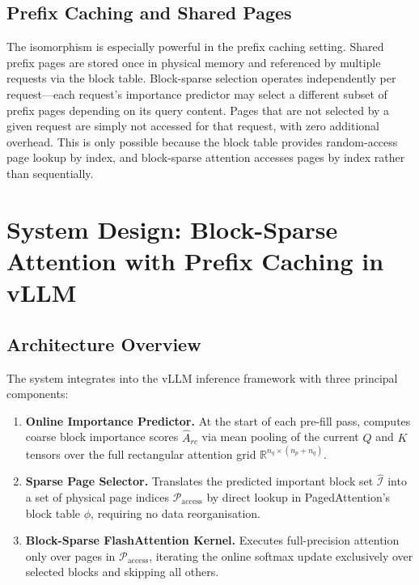 \documentclass{article}
\begin{document}
\subsection{Prefix Caching and Shared Pages}

The isomorphism is especially powerful in the prefix caching setting.
Shared prefix pages are stored once in physical memory and referenced by
multiple requests via the block table. Block-sparse selection operates
independently per request---each request's importance predictor may select
a different subset of prefix pages depending on its query content. Pages
that are not selected by a given request are simply not accessed for that
request, with zero additional overhead. This is only possible because the
block table provides random-access page lookup by index, and block-sparse
attention accesses pages by index rather than sequentially.

\section{System Design: Block-Sparse Attention with Prefix Caching in vLLM}
\label{sec:system}

\subsection{Architecture Overview}

The system integrates into the vLLM inference framework with three
principal components:

\begin{enumerate}
  \item \textbf{Online Importance Predictor.} At the start of each
    pre-fill pass, computes coarse block importance scores $\hat{A}_{rc}$
    via mean pooling of the current $Q$ and $K$ tensors over the full
    rectangular attention grid $\mathbb{R}^{n_q \times (n_p + n_q)}$.
  \item \textbf{Sparse Page Selector.} Translates the predicted important
    block set $\hat{\mathcal{I}}$ into a set of physical page indices
    $\mathcal{P}_{\text{access}}$ by direct lookup in PagedAttention's
    block table $\phi$, requiring no data reorganisation.
  \item \textbf{Block-Sparse FlashAttention Kernel.} Executes
    full-precision attention only over pages in $\mathcal{P}_{\text{access}}$,
    iterating the online softmax update exclusively over selected blocks
    and skipping all others.
\end{enumerate}
\end{document}
